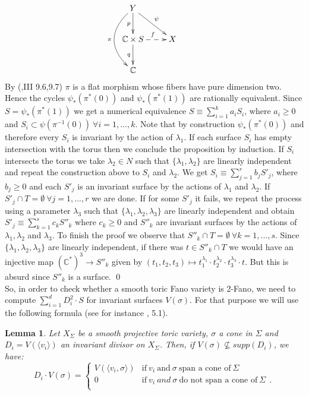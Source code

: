 \documentclass[10pt]{article}
\newtheorem{lema}{Lemma}[section]
\begin{document}
$$\xymatrix{
Y \ar@/_0.8cm/[dd]_{\pi}
 \ar[d]_p \ar[dr]^{\psi} & \\ 
\mathbb{C}\times S \ar[d]_q \ar@{-->}[r]^f  & X  \\
\mathbb{C} & & 
}$$
 By (\cite{hartshorne},III 9.6,9.7) $\pi$ is a flat morphism whose fibers have pure dimension two. Hence the cycles $\psi_*(\pi^*(0))$ and $\psi_*(\pi^*(1))$ are rationally equivalent. Since $S=\psi_*(\pi^*(1))$ we get a numerical equivalence $S\equiv \displaystyle\sum_{i=1}^ {k}a_iS_i$, where $a_i\geq 0$ and $S_i\subset \psi(\pi^{-1}(0)) \ \forall i=1,...,k$. Note that by construction $\psi_*(\pi^*(0))$ and therefore every $S_i$ is invariant by the action of $\lambda_1$. If each surface $S_i$ has empty intersection with the torus then we conclude the proposition by induction. If $S_i$ intersects the torus we take $\lambda_2\in N$ such that $\{\lambda_1, \lambda_2\}$ are linearly independent and repeat the construction above to $S_i$ and $\lambda_2$. We get $S_i\equiv \displaystyle\sum_{j=1}^{r}b_jS'_j$, where $b_j\geq 0$ and each $S'_j$ is an invariant surface by the actions of $\lambda_1$ and $\lambda_2$. If $S'_j\cap T=\emptyset \ \forall j=1,...,r$ we are done. If for some $S'_j$ it fails, we repeat the process using a parameter $\lambda_3$ such that $\{\lambda_1,\lambda_2,\lambda_3\}$ are linearly independent and obtain $S'_j\equiv \displaystyle\sum_{k=1}^{s}c_kS''_k$ where $c_k\geq 0$ and $S''_k$ are invariant surfaces by the actions of $\lambda_1, \lambda_2$ and $\lambda_3$. To finish the proof we observe that $S''_k\cap T=\emptyset \ \forall k=1,...,s$. Since $\{\lambda_1, \lambda_2,\lambda_3\}$ are linearly independent, if there was $t\in S''_k\cap T$ we would have an injective map $(\mathbb{C}^*)^3\rightarrow S''_k$ given by $(t_1,t_2,t_3)\mapsto t_1^{\lambda_1}\cdot t_2^{\lambda_2}\cdot t_3^{\lambda_3}\cdot t$. But this is absurd since $S''_k$ is a surface. \qed   \\

So, in order to check whether a smooth toric Fano variety is 2-Fano, we need to compute $\displaystyle \sum_{i=1}^{d}D_i^2 \cdot S$ for invariant surfaces $V(\sigma)$. For that purpose we will use the following formula (see for instance \cite{fulton}, 5.1).\\

\begin{lema} Let  $X_{\Sigma}$ be a smooth projective toric variety, $\sigma$ a cone in $\Sigma$ and $D_i=V(\langle v_i \rangle)$ an invariant divisor on $X_{\Sigma}$. Then, if $V(\sigma)\nsubseteq supp (D_i)$, we have:\\
 $$D_i \cdot V(\sigma)  =
\left\{
\begin{array}{ll}
  V(\langle v_i,\sigma \rangle)  & \text{if} \ v_i \ \text{and} \ \sigma \ \text{span a cone of}\  \Sigma\\
  0 & \text{if} \ v_i \ and \ \sigma \ \text{do not span a cone of}\  \Sigma \ \ . \\
\end{array}
\right.
$$
\\
\end{lema}
 
\end{document}
